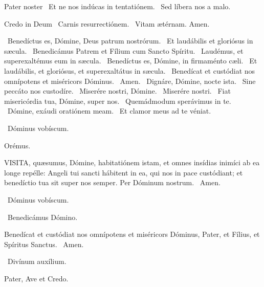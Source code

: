 Pater noster  \V\ Et ne nos indúcas in tentatiónem. \R\ Sed líbera nos a malo.

Credo in Deum  \V\ Carnis resurrectiónem. \R\ Vitam ætérnam. Amen.

\V\ Benedíctus es, Dómine, Deus patrum nostrórum. \R\ Et laudábilis et gloriósus in sæcula. \V\ Benedicámus Patrem et Fílium cum Sancto Spíritu. \R\ Laudémus, et superexaltémus eum in sæcula. \V\ Benedíctus es, Dómine, in firmaménto cæli. \R\ Et laudábilis, et gloriósus, et superexaltátus in sæcula. \V\ Benedícat et custódiat nos omnípotens et miséricors Dóminus. \R\ Amen. \V\ Dignáre, Dómine, nocte ista. \R\ Sine peccáto nos custodíre. \V\ Miserére nostri, Dómine. \R\ Miserére nostri. \V\ Fiat misericórdia tua, Dómine, super nos. \R\ Quemádmodum sperávimus in te. \V\ Dómine, exáudi oratiónem meam. \R\ Et clamor meus ad te véniat.

\V\ Dóminus vobíscum.

Orémus. 

\lettrine[lines=2]{V}{ISITA}, quæsumus, Dómine, habitatiónem istam, et omnes insídias inimíci ab ea longe repélle: Angeli tui sancti hábitent in ea, qui nos in pace custódiant; et benedíctio tua sit super nos semper. Per Dóminum nostrum. \R\ Amen.

\V\ Dóminus vobíscum.

\V\ Benedicámus Dómino.

 Benedícat et custódiat nos omnípotens et miséricors Dóminus, Pater, et Fílius, et Spíritus Sanctus. \R\ Amen.


\V\ Divínum auxílium.

Pater, Ave et Credo.


